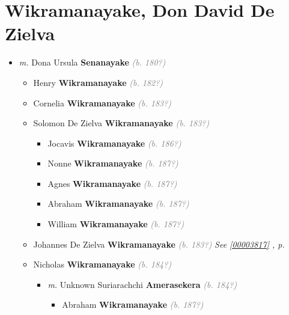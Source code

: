\documentclass[10pt, openany]{book}
\begin{document}
\chapter{Wikramanayake, Don David De Zielva}
\label{00003804}
\textcolor{slmaroon}{\textit{}}
\begin{itemize}
\item{\textit{m.} Dona Ursula \textbf{Senanayake} \textcolor{gray}{\textit{(b. 180?)}}   \label{couple:00003804:00003805} \begin{itemize}
\item{Henry \textbf{Wikramanayake} \textcolor{gray}{\textit{(b. 182?)}}
 }
\item{Cornelia \textbf{Wikramanayake} \textcolor{gray}{\textit{(b. 183?)}}
 }
\item{Solomon De Zielva \textbf{Wikramanayake} \textcolor{gray}{\textit{(b. 183?)}}
\begin{itemize}
\item{Jocavis \textbf{Wikramanayake} \textcolor{gray}{\textit{(b. 186?)}}
 }
\item{Nonne \textbf{Wikramanayake} \textcolor{gray}{\textit{(b. 187?)}}
 }
\item{Agnes \textbf{Wikramanayake} \textcolor{gray}{\textit{(b. 187?)}}
 }
\item{Abraham \textbf{Wikramanayake} \textcolor{gray}{\textit{(b. 187?)}}
 }
\item{William \textbf{Wikramanayake} \textcolor{gray}{\textit{(b. 187?)}}
 }
\end{itemize}
   }
\item{Johannes De Zielva \textbf{Wikramanayake} \textcolor{gray}{\textit{(b. 183?)}} \textcolor{slteal}{\textit{See  \autoref{00003817} \textit{, p. \pageref{00003817} }}}}
\item{Nicholas \textbf{Wikramanayake} \textcolor{gray}{\textit{(b. 184?)}}
\begin{itemize}
\item{\textit{m.} Unknown Suriarachchi \textbf{Amerasekera} \textcolor{gray}{\textit{(b. 184?)}}   \label{couple:00003891:00003892} \begin{itemize}
\item{Abraham \textbf{Wikramanayake} \textcolor{gray}{\textit{(b. 187?)}}
}
\end{itemize}}
\end{itemize}}
\end{itemize}}
\end{itemize}
\end{document}
